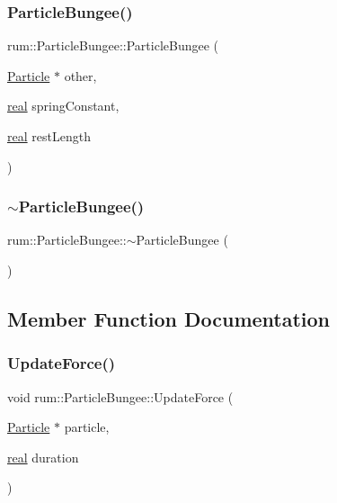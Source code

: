\subsubsection{\texorpdfstring{Particle\+Bungee()}{ParticleBungee()}}
{\footnotesize\ttfamily rum\+::\+Particle\+Bungee\+::\+Particle\+Bungee (\begin{DoxyParamCaption}\item[{\hyperlink{classrum_1_1_particle}{Particle} $\ast$}]{other,  }\item[{\hyperlink{namespacerum_a7e8cca23573d5eaead0f138cbaa4862c}{real}}]{spring\+Constant,  }\item[{\hyperlink{namespacerum_a7e8cca23573d5eaead0f138cbaa4862c}{real}}]{rest\+Length }\end{DoxyParamCaption})\hspace{0.3cm}{\ttfamily [explicit]}}

\mbox{\label{classrum_1_1_particle_bungee_aaff4a95227aaec80896d0030ded6c6b3}} 
\subsubsection{\texorpdfstring{$\sim$\+Particle\+Bungee()}{~ParticleBungee()}}
{\footnotesize\ttfamily rum\+::\+Particle\+Bungee\+::$\sim$\+Particle\+Bungee (\begin{DoxyParamCaption}{ }\end{DoxyParamCaption})}



\subsection{Member Function Documentation}
\mbox{\label{classrum_1_1_particle_bungee_a631e7f4c92c881b9a62471e2f75e2a2c}} 
\subsubsection{\texorpdfstring{Update\+Force()}{UpdateForce()}}
{\footnotesize\ttfamily void rum\+::\+Particle\+Bungee\+::\+Update\+Force (\begin{DoxyParamCaption}\item[{\hyperlink{classrum_1_1_particle}{Particle} $\ast$}]{particle,  }\item[{\hyperlink{namespacerum_a7e8cca23573d5eaead0f138cbaa4862c}{real}}]{duration }\end{DoxyParamCaption})\hspace{0.3cm}{\ttfamily [virtual]}}



